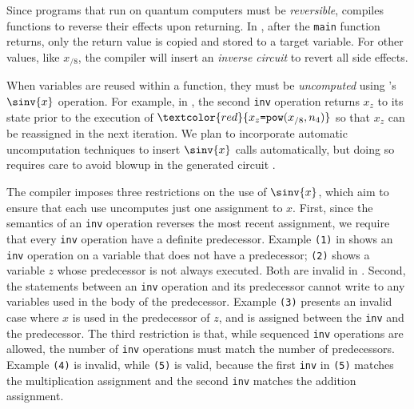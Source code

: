 
\label{sec:revcomp}

Since programs that run on quantum computers must be
\emph{reversible}, \vqimp compiles functions to reverse their
effects upon returning. In , after the
\texttt{main} function returns, only the return value is copied and
stored to a target variable. For other values, like $x_{/8}$, the 
compiler will insert an \emph{inverse circuit} to revert all side effects.

When variables are reused within a function, they must be
\emph{uncomputed} using \vqimp's $\sinv{x}$ operation. For
example, in , the second \texttt{inv} operation
returns $x_z$ to its state prior to the execution of
$\textcolor{red}{x_z\texttt{=}\texttt{pow}(x_{/8},n_4)}$ so that $x_z$ 
can be reassigned in the next iteration.
We plan to incorporate automatic uncomputation techniques to insert $\sinv{x}$ calls automatically, but doing so requires care to avoid blowup in the generated circuit \cite{unqomp}. 

The \name compiler imposes three restrictions on the use of $\sinv{x}$, 
which aim to ensure that each use uncomputes just one assignment to $x$.
%
First, since the semantics of an \texttt{inv} operation reverses the
most recent assignment, we require that every \texttt{inv} operation
have a definite predecessor. Example \texttt{(1)} in 
shows an \texttt{inv} operation on a variable that does not have a
predecessor; \texttt{(2)} shows a variable $z$ whose
predecessor is not always executed. Both are invalid in \vqimp.
Second, the statements between an \texttt{inv} operation and its
predecessor cannot write to any variables used in the body of the
predecessor. Example \texttt{(3)} presents an invalid case where $x$
is used in the predecessor of $z$, and is assigned between the
\texttt{inv} and the predecessor.  The third restriction is that, while
sequenced \texttt{inv} operations are allowed, the number of \texttt{inv}
operations must match the number of predecessors. Example \texttt{(4)}
is invalid, while \texttt{(5)} is valid, because the first
\texttt{inv} in \texttt{(5)} matches the multiplication assignment
and the second \texttt{inv} matches the addition assignment.

